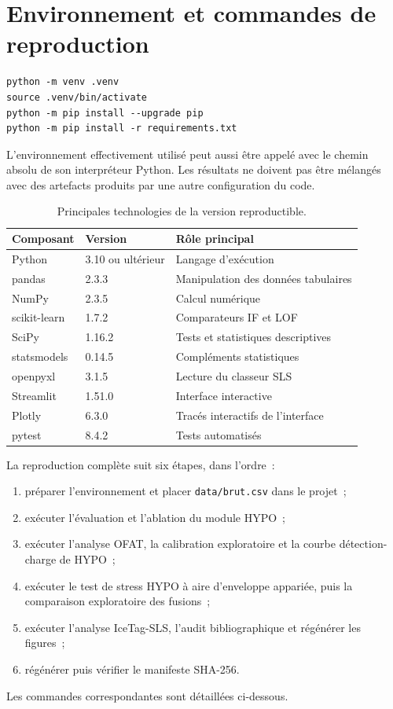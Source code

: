 \section{Environnement et commandes de reproduction}
\begin{verbatim}
python -m venv .venv
source .venv/bin/activate
python -m pip install --upgrade pip
python -m pip install -r requirements.txt
\end{verbatim}

L'environnement effectivement utilisé peut aussi être appelé avec le chemin absolu de son
interpréteur Python. Les résultats ne doivent pas être mélangés avec des artefacts produits
par une autre configuration du code.
\begin{table}[H]
  \centering
  \caption{Principales technologies de la version reproductible.}
  \label{tab:technologies}
  \small
  \begin{tabular}{lll}
    \toprule
    Composant & Version & Rôle principal \\
    \midrule
    Python & 3.10 ou ultérieur & Langage d'exécution \\
    pandas & 2.3.3 & Manipulation des données tabulaires \\
    NumPy & 2.3.5 & Calcul numérique \\
    scikit-learn & 1.7.2 & Comparateurs IF et LOF \\
    SciPy & 1.16.2 & Tests et statistiques descriptives \\
    statsmodels & 0.14.5 & Compléments statistiques \\
    openpyxl & 3.1.5 & Lecture du classeur SLS \\
    Streamlit & 1.51.0 & Interface interactive \\
    Plotly & 6.3.0 & Tracés interactifs de l'interface \\
    pytest & 8.4.2 & Tests automatisés \\
    \bottomrule
  \end{tabular}
\end{table}


La reproduction complète suit six étapes, dans l'ordre~:
\begin{enumerate}
  \item préparer l'environnement et placer \texttt{data/brut.csv} dans le projet~;
  \item exécuter l'évaluation et l'ablation du module HYPO~;
  \item exécuter l'analyse OFAT, la calibration exploratoire et la courbe
  détection-charge de HYPO~;
  \item exécuter le test de stress HYPO à aire d'enveloppe appariée, puis la comparaison exploratoire des fusions~;
  \item exécuter l'analyse IceTag-SLS, l'audit bibliographique et régénérer les figures~;
  \item régénérer puis vérifier le manifeste SHA-256.
\end{enumerate}
Les commandes correspondantes sont détaillées ci-dessous.

